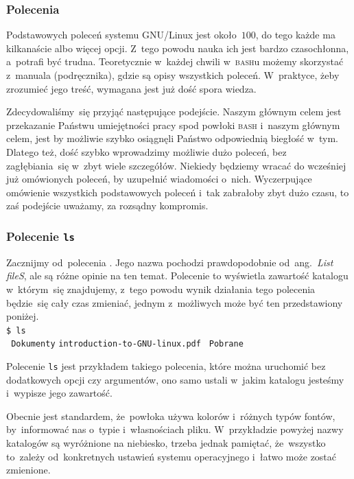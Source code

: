 \documentclass[10pt,t]{beamer}
\begin{document}
\begin{frame}
  \frametitle{Polecenia}


  Podstawowych poleceń systemu GNU/Linux jest około~$100$, do tego każde ma
  kilkanaście albo więcej opcji. Z~tego powodu nauka ich jest bardzo
  czasochłonna, a~potrafi być trudna. Teoretycznie w~każdej chwili
  w~\textsc{bash}u możemy skorzystać z~manuala (podręcznika), gdzie są opisy
  wszystkich poleceń. W~praktyce, żeby zrozumieć jego treść, wymagana jest
  już dość spora wiedza.

  Zdecydowaliśmy~się przyjąć następujące podejście. Naszym głównym celem
  jest przekazanie Państwu umiejętności pracy spod powłoki \textsc{bash}
  i~naszym głównym celem, jest by możliwie szybko osiągnęli Państwo
  odpowiednią biegłość w~tym. Dlatego też, dość szybko wprowadzimy możliwie
  dużo poleceń, bez zagłębiania~się w~zbyt wiele szczegółów. Niekiedy
  będziemy wracać do wcześniej już omówionych poleceń, by uzupełnić
  wiadomości o~nich. Wyczerpujące omówienie wszystkich podstawowych poleceń
  i~tak zabrałoby zbyt dużo czasu, to zaś podejście uważamy, za rozsądny
  kompromis.

\end{frame}





\begin{frame}
  \frametitle{Polecenie \texttt{ls}}


  Zacznijmy od~polecenia
  . Jego nazwa
  pochodzi prawdopodobnie od~ang.~\textit{List fileS}, ale są różne opinie
  na ten temat. Polecenie to wyświetla zawartość katalogu w~którym~się
  znajdujemy, z~tego powodu wynik działania tego polecenia będzie~się cały
  czas zmieniać, jednym z~możliwych może być ten przedstawiony poniżej. \\
  \texttt{\$ ls} \\
  \texttt{{\color{jAxisBlue} Dokumenty}} \quad
  \texttt{introduction-to-GNU-linux.pdf} \quad
  \texttt{{\color{jAxisBlue} Pobrane}}

  Polecenie \texttt{ls} jest przykładem takiego polecenia, które można
  uruchomić bez dodatkowych opcji czy argumentów, ono samo ustali w~jakim
  katalogu jesteśmy i~wypisze jego zawartość.

  Obecnie jest standardem, że~powłoka używa kolorów i~różnych typów fontów,
  by~informować nas o~typie i~własnościach pliku. W~przykładzie powyżej
  nazwy katalogów są wyróżnione na niebiesko, trzeba jednak pamiętać,
  że~wszystko to~zależy od~konkretnych ustawień systemu operacyjnego
  i~łatwo może zostać zmienione.

\end{frame}
\end{document}
